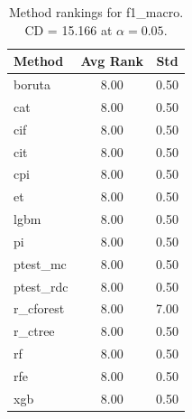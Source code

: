 \begin{table}[h]
\centering
\caption{Method rankings for f1_macro. CD = 15.166 at $\alpha=0.05$.}
\label{tab:ranks_f1_macro}
\begin{tabular}{lcc}
\toprule
Method & Avg Rank & Std \\
\midrule
boruta & 8.00 & 0.50 \\
cat & 8.00 & 0.50 \\
cif & 8.00 & 0.50 \\
cit & 8.00 & 0.50 \\
cpi & 8.00 & 0.50 \\
et & 8.00 & 0.50 \\
lgbm & 8.00 & 0.50 \\
pi & 8.00 & 0.50 \\
ptest_mc & 8.00 & 0.50 \\
ptest_rdc & 8.00 & 0.50 \\
r_cforest & 8.00 & 7.00 \\
r_ctree & 8.00 & 0.50 \\
rf & 8.00 & 0.50 \\
rfe & 8.00 & 0.50 \\
xgb & 8.00 & 0.50 \\
\bottomrule
\end{tabular}
\end{table}